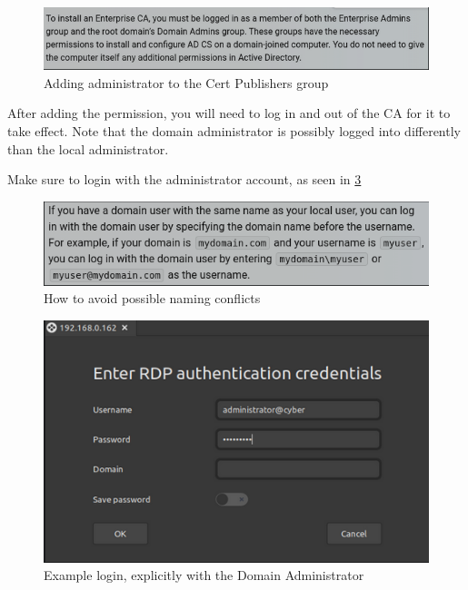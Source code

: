 \documentclass{article}
\begin{document}
\begin{figure}[H]
        \centering
        \includegraphics[width=1\textwidth]{BingOnPermissions.png}
        \caption{Adding administrator to the Cert Publishers group}
        \label{fig:BingOnPermissions}
\end{figure}

After adding the permission, you will need to log in and out of the CA for it to take effect.
Note that the domain administrator is possibly logged into differently than the local administrator.

Make sure to login with the administrator account, as seen in \ref{fig:ExampleLoginNETBIOS}

\begin{figure}[H]
        \centering
        \includegraphics[width=1\textwidth]{BingDomainUserAdminUser.png}
        \caption{How to avoid possible naming conflicts}
        \label{fig:BingDomainUserAdminUser}
\end{figure}

\begin{figure}[H]
        \centering
        \includegraphics[width=1\textwidth]{ExampleLoginNETBIOS.png}
        \caption{Example login, explicitly with the Domain Administrator}
        \label{fig:ExampleLoginNETBIOS}
\end{figure}
\end{document}
